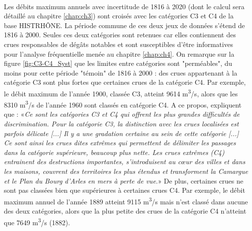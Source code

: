 	\paragraph{} Les débits maximum annuels avec incertitude de 1816 à 2020 (dont le calcul sera détaillé au chapitre \ref{chap:ch3}) sont croisés avec les catégories C3 et C4 de la base HISTRHÔNE. La période commune de ces deux jeux de données s'étend de 1816 à 2000. Seules ces deux catégories sont retenues car elles contiennent des crues responsables de dégâts notables et sont susceptibles d'être informatives pour l'analyse fréquentielle menée au chapitre \ref{chap:ch4}. On remarque sur la figure \ref{fig:C3-C4_Syst} que les limites entre catégories sont "perméables", du moins pour cette période "témoin" de 1816 à 2000 : des crues appartenant à la catégorie C3 sont plus fortes que certaines crues de la catégorie C4. Par exemple, le débit maximum de l'année 1900, classée C3, atteint 9614 m\textsuperscript{3}/s, alors que les 8310 m\textsuperscript{3}/s de l'année 1960 sont classés en catégorie C4. A ce propos, \citet{pichard_sept_2014} expliquent que : «\textit{Ce sont les catégories C3 et C4 qui offrent les plus grandes difficultés de discrimination. Pour la catégorie C3, la distinction avec les crues localisées est parfois délicate [...] Il y a une gradation certaine au sein de cette catégorie [...] Ce sont ainsi les crues dites extrêmes qui permettent de délimiter les passages dans la catégorie supérieure, beaucoup plus nette. Les crues extrêmes (C4) entrainent des destructions importantes, s'introduisent au cœur des villes et dans les maisons, couvrent des territoires les plus étendus et transforment la Camargue et le Plan du Bourg d'Arles en mers à perte de vue.}» De plus, certaines crues ne sont pas classées bien que supérieures à certaines crues C4. Par exemple, le débit maximum annuel de l'année 1889 atteint 9115 m\textsuperscript{3}/s mais n'est classé dans aucune des deux catégories, alors que la plus petite des crues de la catégorie C4 n'atteint que 7649 m\textsuperscript{3}/s (1882). 
	
